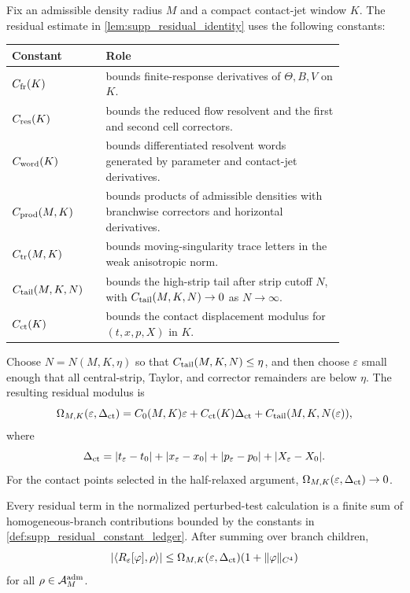 \begin{definition}
\label{def:supp_residual_constant_ledger}
Fix an admissible density radius \(M\) and a compact contact-jet window \(K\).
The residual estimate in \cref{lem:supp_residual_identity} uses the following
constants:
\begin{center}
\small
\begin{tabular}{p{0.22\linewidth}p{0.62\linewidth}}
\hline
Constant & Role \\
\hline
\(C_{\rm fr}(K)\) & bounds finite-response derivatives of
\(\Theta,B,V\) on \(K\). \\
\(C_{\rm res}(K)\) & bounds the reduced flow resolvent and the first and second
cell correctors. \\
\(C_{\rm word}(K)\) & bounds differentiated resolvent words generated by
parameter and contact-jet derivatives. \\
\(C_{\rm prod}(M,K)\) & bounds products of admissible densities with
branchwise correctors and horizontal derivatives. \\
\(C_{\rm tr}(M,K)\) & bounds moving-singularity trace letters in the weak
anisotropic norm. \\
\(C_{\rm tail}(M,K,N)\) & bounds the high-strip tail after strip cutoff \(N\),
with \(C_{\rm tail}(M,K,N)\to0\) as \(N\to\infty\). \\
\(C_{\rm ct}(K)\) & bounds the contact displacement modulus for
\((t,x,p,X)\) in \(K\). \\
\hline
\end{tabular}
\end{center}
Choose \(N=N(M,K,\eta)\) so that \(C_{\rm tail}(M,K,N)\le\eta\), and then
choose \(\varepsilon\) small enough that all central-strip, Taylor, and
corrector remainders are below \(\eta\).  The resulting residual modulus is
\[
  \Omega_{M,K}(\varepsilon,\Delta_{\rm ct})
  =
  C_0(M,K)\varepsilon
  +C_{\rm ct}(K)\Delta_{\rm ct}
  +C_{\rm tail}(M,K,N(\varepsilon)),
\]
where
\[
  \Delta_{\rm ct}
  =
  |t_\varepsilon-t_0|+|x_\varepsilon-x_0|
  +|p_\varepsilon-p_0|+|X_\varepsilon-X_0|.
\]
For the contact points selected in the half-relaxed argument,
\(\Omega_{M,K}(\varepsilon,\Delta_{\rm ct})\to0\).
\end{definition}

\begin{lemma}
\label{lem:supp_branch_residual_summation}
Every residual term in the normalized perturbed-test calculation is a finite
sum of homogeneous-branch contributions bounded by the constants in
\cref{def:supp_residual_constant_ledger}.  After summing over branch children,
\[
  |\langle R_\varepsilon[\varphi],\rho\rangle|
  \le
  \Omega_{M,K}(\varepsilon,\Delta_{\rm ct})
  (1+\|\varphi\|_{C^4})
\]
for all \(\rho\in\mathcal A^{\mathrm{adm}}_M\).
\end{lemma}

